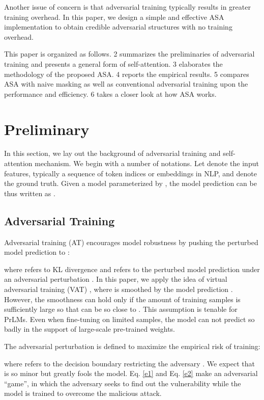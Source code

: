 \documentclass[letterpaper]{article} \usepackage{aaai23}  \usepackage{times}  \usepackage{helvet}  \usepackage{courier}  \usepackage[hyphens]{url}  \usepackage{graphicx} \urlstyle{rm} \def\UrlFont{\rm}  \usepackage{natbib}  \usepackage{caption} \frenchspacing  \setlength{\pdfpagewidth}{8.5in}  \setlength{\pdfpageheight}{11in}  \usepackage{algorithm}
\begin{document}
Another issue of concern is that adversarial training typically results in greater training overhead. In this paper, we design a simple and effective ASA implementation to obtain credible adversarial structures with no training overhead.

This paper is organized as follows.  2 summarizes the preliminaries of adversarial training and presents a general form of self-attention.  3 elaborates the methodology of the proposed ASA.  4 reports the empirical results.  5 compares ASA with naive masking as well as conventional adversarial training upon the performance and efficiency.  6 takes a closer look at how ASA works.


\section{Preliminary}
\label{s2}

In this section, we lay out the background of adversarial training and self-attention mechanism. We begin with a number of notations. Let  denote the input features, typically a sequence of token indices or embeddings in NLP, and  denote the ground truth. Given a model parameterized by , the model prediction can be thus written as .

\subsection{Adversarial Training}

Adversarial training (AT) \citep{DBLP:journals/corr/GoodfellowSS14} encourages model robustness by pushing the perturbed model prediction to :

where  refers to KL divergence and  refers to the perturbed model prediction under an adversarial perturbation . In this paper, we apply the idea of virtual adversarial training (VAT) \citep{DBLP:journals/pami/MiyatoMKI19}, where  is smoothed by the model prediction . However, the smoothness can hold only if the amount of training samples is sufficiently large so that  can be so close to . This assumption is tenable for PrLMs. Even when fine-tuning on limited samples, the model can not predict so badly in the support of large-scale pre-trained weights.

The adversarial perturbation  is defined to maximize the empirical risk of training:

where  refers to the decision boundary restricting the adversary . We expect that  is so minor but greatly fools the model. Eq. \ref{e1} and Eq. \ref{e2} make an adversarial ``game'', in which the adversary seeks to find out the vulnerability while the model is trained to overcome the malicious attack.
\end{document}
